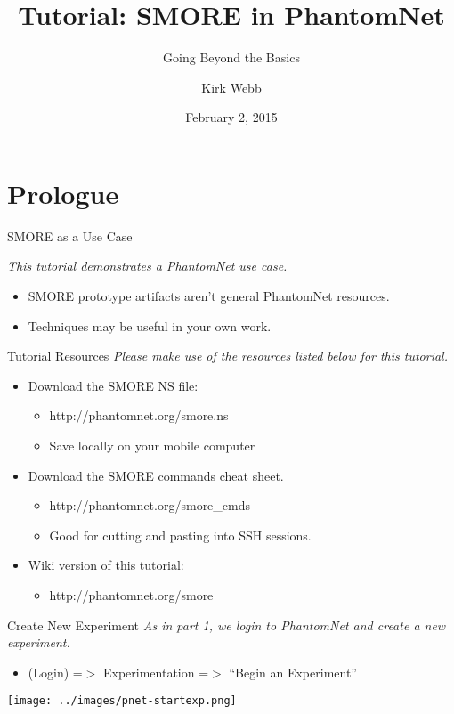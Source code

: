 \documentclass[xcolor=pdftex,dvipsnames,table]{beamer}
\title{Tutorial: SMORE in PhantomNet}
\subtitle{Going Beyond the Basics}
\author{Kirk Webb}
\institute{2015 PhantomNet Workshop}
\date{February 2, 2015}
\begin{document}
\begin{frame}
\titlepage
\end{frame}

\section{Prologue}

\begin{frame}{SMORE as a Use Case}
  \centerline{\emph{This tutorial demonstrates a PhantomNet use case.}}
  \vspace{0.1in}
  \begin{itemize}
  \item SMORE prototype artifacts aren't general PhantomNet resources.
  \item Techniques may be useful in your own work.
  \end{itemize}
\end{frame}

\begin{frame}{Tutorial Resources}
  \emph{Please make use of the resources listed below for this tutorial.}
  \vspace{0.1in}
  \begin{itemize}
  \item Download the SMORE NS file:
    \begin{itemize}
    \item http://phantomnet.org/smore.ns
    \item Save locally on your mobile computer
    \end{itemize}
  \item Download the SMORE commands cheat sheet.
    \begin{itemize}
      \item http://phantomnet.org/smore\_cmds
      \item Good for cutting and pasting into SSH sessions.
    \end{itemize}
  \item Wiki version of this tutorial:
    \begin{itemize}
      \item http://phantomnet.org/smore
    \end{itemize}
  \end{itemize}
\end{frame}

\begin{frame}{Create New Experiment}
  \emph{As in part 1, we login to PhantomNet and create a new experiment.}
  \begin{itemize}
  \item (Login) =$>$ Experimentation =$>$ ``Begin an Experiment''
  \end{itemize}
  \centerline{\texttt{[image: ../images/pnet-startexp.png]}}
\end{frame}
\end{document}
